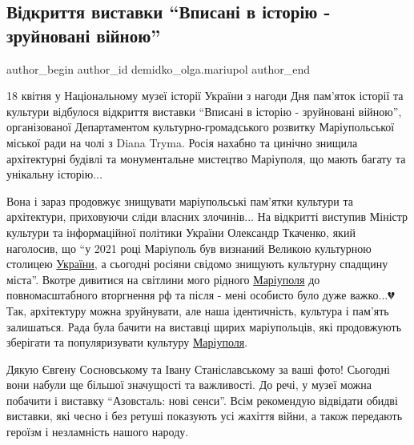  
 
 
 
 

\subsection{Відкриття виставки \enquote{Вписані в історію - \titlebreak зруйновані війною}}
\label{sec:18_04_2023.fb.demidko_olga.mariupol.1.vidkryttja_vystavky_vpysani_v_istoriu_zrujnovani_vijnoju}

\ifcmt
 author_begin
   author_id demidko_olga.mariupol
 author_end
\fi

18 квітня у Національному музеї історії України з нагоди Дня пам'яток історії
та культури  відбулося відкриття виставки \enquote{Вписані в історію - зруйновані
війною}, організованої Департаментом культурно-громадського розвитку
Маріупольської міської ради на чолі з Diana Tryma. Росія нахабно та цинічно
знищила архітектурні будівлі та монументальне мистецтво Маріуполя, що мають
багату та унікальну історію... 

Вона і зараз продовжує знищувати маріупольські
пам'ятки культури та архітектури, приховуючи сліди власних злочинів... На
відкритті виступив Міністр культури та інформаційної політики України
Олександр Ткаченко, який наголосив, що \enquote{у 2021 році Маріуполь був визнаний
Великою культурною столицею \href{\urlUkrainaIA}{України}, а сьогодні росіяни свідомо знищують
культурну спадщину міста}. Вкотре дивитися на світлини мого рідного \href{\urlMariupolIA}{Маріуполя}
до повномасштабного вторгнення рф та після - мені особисто було дуже важко...💔
Так, архітектуру можна зруйнувати, але наша ідентичність, культура і пам'ять
залишаться.  Рада була бачити на виставці щирих маріупольців, які продовжують
зберігати та популяризувати культуру \href{\urlMariupolIA}{Маріуполя}. 

Дякую Євгену Сосновському та Івану Станіславському за ваші фото! Сьогодні вони набули ще більшої значущості та
важливості. До речі, у музеї можна побачити і виставку \enquote{Азовсталь: нові сенси}.
Всім рекомендую відвідати обидві виставки, які чесно і без ретуші показують усі
жахіття війни, а також передають героїзм і незламність нашого народу.

